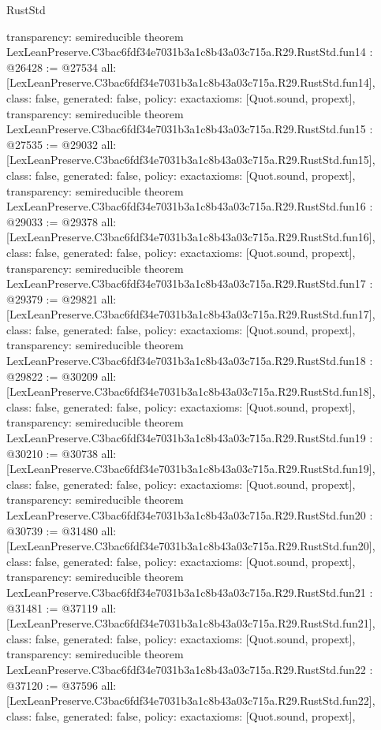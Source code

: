 \begin{lexlean}{RustStd}
\begin{coremodule}
{  transparency: semireducible
}
theorem LexLeanPreserve.C3bac6fdf34e7031b3a1c8b43a03c715a.R29.RustStd.fun14 : @26428 := @27534 {
  all: [LexLeanPreserve.C3bac6fdf34e7031b3a1c8b43a03c715a.R29.RustStd.fun14],
  class: false,
  generated: false,
  policy: exact{axioms: [Quot.sound, propext]},
  transparency: semireducible
}
theorem LexLeanPreserve.C3bac6fdf34e7031b3a1c8b43a03c715a.R29.RustStd.fun15 : @27535 := @29032 {
  all: [LexLeanPreserve.C3bac6fdf34e7031b3a1c8b43a03c715a.R29.RustStd.fun15],
  class: false,
  generated: false,
  policy: exact{axioms: [Quot.sound, propext]},
  transparency: semireducible
}
theorem LexLeanPreserve.C3bac6fdf34e7031b3a1c8b43a03c715a.R29.RustStd.fun16 : @29033 := @29378 {
  all: [LexLeanPreserve.C3bac6fdf34e7031b3a1c8b43a03c715a.R29.RustStd.fun16],
  class: false,
  generated: false,
  policy: exact{axioms: [Quot.sound, propext]},
  transparency: semireducible
}
theorem LexLeanPreserve.C3bac6fdf34e7031b3a1c8b43a03c715a.R29.RustStd.fun17 : @29379 := @29821 {
  all: [LexLeanPreserve.C3bac6fdf34e7031b3a1c8b43a03c715a.R29.RustStd.fun17],
  class: false,
  generated: false,
  policy: exact{axioms: [Quot.sound, propext]},
  transparency: semireducible
}
theorem LexLeanPreserve.C3bac6fdf34e7031b3a1c8b43a03c715a.R29.RustStd.fun18 : @29822 := @30209 {
  all: [LexLeanPreserve.C3bac6fdf34e7031b3a1c8b43a03c715a.R29.RustStd.fun18],
  class: false,
  generated: false,
  policy: exact{axioms: [Quot.sound, propext]},
  transparency: semireducible
}
theorem LexLeanPreserve.C3bac6fdf34e7031b3a1c8b43a03c715a.R29.RustStd.fun19 : @30210 := @30738 {
  all: [LexLeanPreserve.C3bac6fdf34e7031b3a1c8b43a03c715a.R29.RustStd.fun19],
  class: false,
  generated: false,
  policy: exact{axioms: [Quot.sound, propext]},
  transparency: semireducible
}
theorem LexLeanPreserve.C3bac6fdf34e7031b3a1c8b43a03c715a.R29.RustStd.fun20 : @30739 := @31480 {
  all: [LexLeanPreserve.C3bac6fdf34e7031b3a1c8b43a03c715a.R29.RustStd.fun20],
  class: false,
  generated: false,
  policy: exact{axioms: [Quot.sound, propext]},
  transparency: semireducible
}
theorem LexLeanPreserve.C3bac6fdf34e7031b3a1c8b43a03c715a.R29.RustStd.fun21 : @31481 := @37119 {
  all: [LexLeanPreserve.C3bac6fdf34e7031b3a1c8b43a03c715a.R29.RustStd.fun21],
  class: false,
  generated: false,
  policy: exact{axioms: [Quot.sound, propext]},
  transparency: semireducible
}
theorem LexLeanPreserve.C3bac6fdf34e7031b3a1c8b43a03c715a.R29.RustStd.fun22 : @37120 := @37596 {
  all: [LexLeanPreserve.C3bac6fdf34e7031b3a1c8b43a03c715a.R29.RustStd.fun22],
  class: false,
  generated: false,
  policy: exact{axioms: [Quot.sound, propext]},
}
\end{coremodule}
\end{lexlean}
